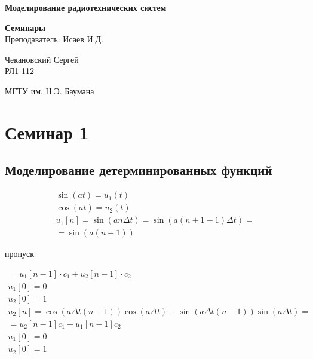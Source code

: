 \documentclass[14pt,a4paper,oneside]{extarticle}
\begin{document}


\begin{titlepage}
    \begin{center}
        \vspace*{1cm}

        \Huge
        \textbf{Моделирование радиотехнических систем}



        \vspace{1.5cm}

        \vfill
        \Huge
        \textbf{Семинары}\\
        \vspace{0.5cm}
        \LARGE
        Преподаватель: Исаев И.Д.
        \vfill

        \LARGE
        Чекановский Сергей\\
        РЛ1-112

        \vspace{0.8cm}


        \Large
        МГТУ им. Н.Э. Баумана

    \end{center}
\end{titlepage}

\tableofcontents

\clearpage

\section{Семинар 1}

\subsection{Моделирование детерминированных функций}

\begin{gather*}
    \sin(at)=u_1(t)\\
    \cos(at)=u_2(t)\\
    u_1[n]=\sin(an\Delta t)=\sin(a(n+1-1)\Delta t)=\\
    =\sin(a(n+1))
\end{gather*}

пропуск

\begin{gather*}
    =u_1[n-1]\cdot c_1+u_2[n-1]\cdot c_2\\
    u_1[0]=0\\
    u_2[0]=1\\
    u_2[n]=\cos(a\Delta t(n-1))\cos(a\Delta t)-\sin(a\Delta t(n-1))\sin(a\Delta t)=\\
    =u_2[n-1]c_1-u_1[n-1]c_2\\
    u_1[0]=0\\
    u_2[0]=1
\end{gather*}
\end{document}
